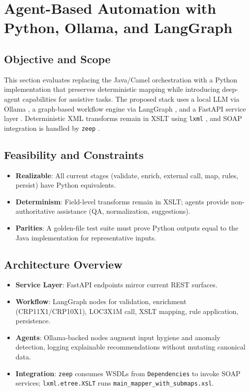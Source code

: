 \documentclass[11pt]{article}
\begin{document}
\section{Agent-Based Automation with Python, Ollama, and LangGraph}
\subsection{Objective and Scope}
This section evaluates replacing the Java/Camel orchestration with a Python implementation that preserves deterministic mapping while introducing deep-agent capabilities for assistive tasks. The proposed stack uses a local LLM via Ollama \cite{ollama-docs}, a graph-based workflow engine via LangGraph \cite{langgraph-docs}, and a FastAPI service layer \cite{fastapi-docs}. Deterministic XML transforms remain in XSLT using \texttt{lxml} \cite{lxml-docs}, and SOAP integration is handled by \texttt{zeep} \cite{zeep-docs}.

\subsection{Feasibility and Constraints}
\begin{itemize}
  \item \textbf{Realizable}: All current stages (validate, enrich, external call, map, rules, persist) have Python equivalents.
  \item \textbf{Determinism}: Field-level transforms remain in XSLT; agents provide non-authoritative assistance (QA, normalization, suggestions).
  \item \textbf{Parities}: A golden-file test suite must prove Python outputs equal to the Java implementation for representative inputs.
\end{itemize}

\subsection{Architecture Overview}
\begin{itemize}
  \item \textbf{Service Layer}: FastAPI endpoints mirror current REST surfaces.
  \item \textbf{Workflow}: LangGraph nodes for validation, enrichment (CRP11X1/CRP10X1), LOC3X1M call, XSLT mapping, rule application, persistence.
  \item \textbf{Agents}: Ollama-backed nodes augment input hygiene and anomaly detection, logging explainable recommendations without mutating canonical data.
  \item \textbf{Integration}: \texttt{zeep} consumes WSDLs from \texttt{Dependencies} to invoke SOAP services; \texttt{lxml.etree.XSLT} runs \texttt{main\_mapper\_with\_submaps.xsl}.
\end{itemize}
\end{document}
